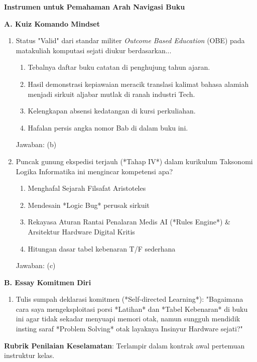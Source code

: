 \documentclass[../main]{subfiles}
\begin{document}
\begin{asesmen}
\textbf{Instrumen untuk Pemahaman Arah Navigasi Buku}

\textbf{A. Kuiz Komando Mindset}

\begin{enumerate}
  \item Status "Valid" dari standar militer \textit{Outcome Based Education} (OBE) pada matakuliah komputasi sejati diukur berdasarkan...
  \begin{enumerate}
    \item Tebalnya daftar buku catatan di penghujung tahun ajaran.
    \item Hasil demonstrasi kepiawaian meracik translasi kalimat bahasa alamiah menjadi sirkuit aljabar mutlak di ranah industri Tech.
    \item Kelengkapan absensi kedatangan di kursi perkuliahan.
    \item Hafalan persis angka nomor Bab di dalam buku ini.
  \end{enumerate}
  Jawaban: (b)

  \item Puncak gunung ekspedisi terjauh (*Tahap IV*) dalam kurikulum Taksonomi Logika Informatika ini mengincar kompetensi apa?
  \begin{enumerate}
    \item Menghafal Sejarah Filsafat Aristoteles
    \item Mendesain *Logic Bug* perusak sirkuit
    \item Rekayasa Aturan Rantai Penalaran Medis AI (*Rules Engine*) \& Arsitektur Hardware Digital Kritis
    \item Hitungan dasar tabel kebenaran T/F sederhana
  \end{enumerate}
  Jawaban: (c)
\end{enumerate}

\textbf{B. Essay Komitmen Diri}

\begin{enumerate}
  \item Tulis sumpah deklarasi komitmen (*Self-directed Learning*): "Bagaimana cara saya mengeksploitasi porsi *Latihan* dan *Tabel Kebenaran* di buku ini agar tidak sekadar menyuapi memori otak, namun sungguh mendidik insting saraf *Problem Solving* otak layaknya Insinyur Hardware sejati?"
\end{enumerate}

\textbf{Rubrik Penilaian Keselamatan}: Terlampir dalam kontrak awal pertemuan instruktur kelas.
\end{asesmen}
\end{document}
